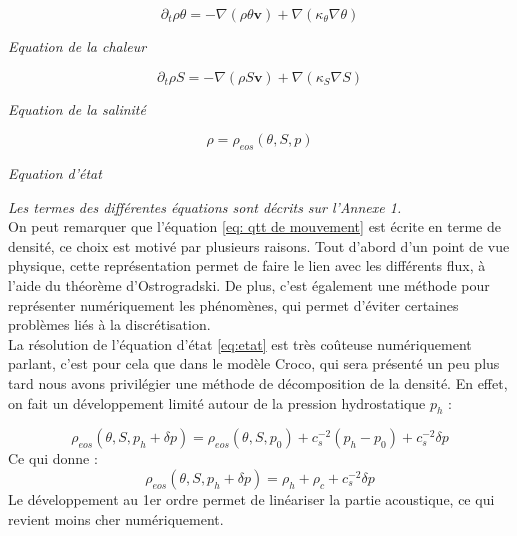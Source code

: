 \documentclass{rapportECC}
\begin{document}
\begin{equation}
    \partial_t \rho \theta = -\nabla(\rho\theta\mathbf{v}) + \nabla(\kappa_{\theta}\nabla\theta)
    \label{eq:chaleur}
\end{equation}
\begin{center}
    \textit{Equation de la chaleur}
\end{center}

\begin{equation}
    \partial_t \rho S = -\nabla(\rho S\mathbf{v}) + \nabla(\kappa_S\nabla S)
    \label{eq:salinite}
\end{equation}
\begin{center}
    \textit{Equation de la salinité} 
\end{center}
\begin{equation}
    \rho = \rho_{eos}(\theta , S, p)
    \label{eq:etat}
\end{equation}
\begin{center}
    \textit{Equation d'état}
\end{center}

\textit{Les termes des différentes équations  sont décrits sur l'Annexe 1.}
\\
On peut remarquer que l'équation \eqref{eq: qtt de mouvement} est écrite en terme de densité, ce choix est motivé par plusieurs raisons. Tout d'abord d'un point de vue physique, cette représentation permet de faire le lien avec les différents flux, à l'aide du théorème d'Ostrogradski. De plus, c'est également une méthode pour représenter numériquement les phénomènes, qui permet d'éviter certaines problèmes liés à la discrétisation. \\

\vspace{0.5 cm}
La résolution de l'équation d'état \eqref{eq:etat} est très coûteuse numériquement parlant, c'est pour cela que dans le modèle Croco, qui sera présenté un peu plus tard nous avons privilégier une méthode de décomposition de la densité. En effet, on fait un développement limité autour de la pression hydrostatique $p_h$ :

\begin{equation}
    \rho_{eos}(\theta, S, p_h +\delta p) = \rho_{eos}(\theta, S, p_0) + c_s^{-2}(p_h - p_0) + c_s^{-2}\delta p
\end{equation}
Ce qui donne :
\begin{equation}
     \rho_{eos}(\theta, S, p_h +\delta p) =  \rho_h + \rho_c + c_s^{-2}\delta p
     \label{eq:decomp densite}
\end{equation}
Le développement au 1er ordre permet de linéariser la partie acoustique, ce qui revient moins cher numériquement.
\vspace{0.5 cm}
\end{document}
